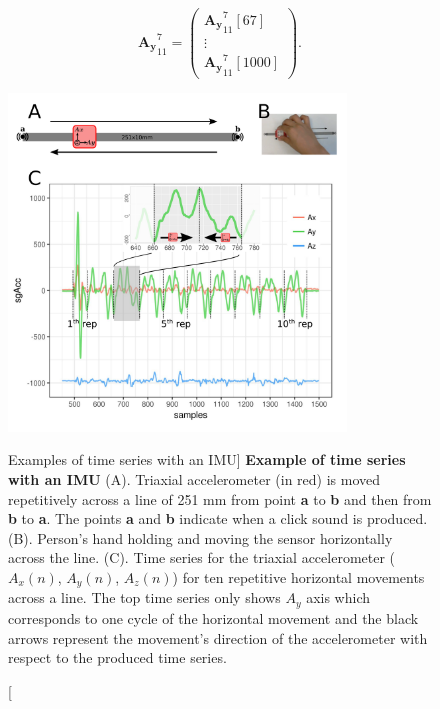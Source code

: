 \begin{equation} \label{eq:etde2_exampleA2}
\boldsymbol{{A_y}}^{7}_{11}  = 
\begin{pmatrix}
\boldsymbol{{A_y}}^{7}_{11}[67] \\
\vdots \\
\boldsymbol{{A_y}}^{7}_{11}[1000] 
\end{pmatrix}.
\end{equation}






\begin{figure}
 \centering
   \includegraphics[width=0.8\textwidth]{hmov}
   \caption
	[Examples of time series with an IMU]{
	{\bf Example of time series with an IMU}
	(A). Triaxial accelerometer (in red) is moved repetitively across a line
   	of 251 mm from point \textbf{a} to \textbf{b} and then from
   	\textbf{b} to \textbf{a}. 
   	The points \textbf{a} and \textbf{b} indicate when a click 
	sound is produced.
	(B). Person's hand holding and moving the sensor horizontally 
	across the line.
	(C). Time series for the triaxial accelerometer 
	($A_x(n)$, $A_y(n)$, $A_z(n)$) for ten repetitive horizontal 
	movements across a line. The top time series only
   	shows $A_y$ axis which corresponds to one cycle of the 
	horizontal movement and the black arrows represent the 
	movement's direction of the accelerometer with respect 
	to the produced time series.
	}
   \label{fig:acc}
\end{figure}






